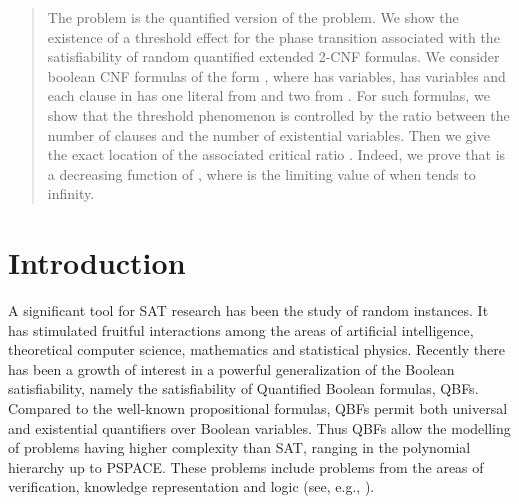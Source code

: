 \documentclass[aop,noinfoline]{imsart}
\begin{document}
\begin{frontmatter}
\begin{abstract}

The  problem is the quantified version of the  problem.
We show the existence of a threshold effect for the phase transition
associated with the satisfiability of random quantified extended 2-CNF
formulas. We consider boolean CNF formulas of the form , where  has  variables,  has 
variables and each clause in  has one literal from  and
two from . For such formulas, we show that the threshold
phenomenon is controlled by the ratio between the number of clauses
and the number  of existential variables. Then we give the exact
location of the associated critical ratio .  Indeed, we prove
that  is a decreasing function of , where  is
the limiting value of  when  tends to infinity. 



\end{abstract}


\begin{keyword}[class=AMS]
\end{keyword}

\begin{keyword}
\end{keyword}

\end{frontmatter}






\section{Introduction}\label{sec:introduction}




A significant tool for SAT research has been the study of random
instances.  It has stimulated fruitful interactions among the areas
of artificial intelligence, theoretical computer science,
mathematics and statistical physics. Recently there has been a
growth of interest in a powerful generalization of the Boolean
satisfiability, namely the satisfiability of Quantified Boolean
formulas, QBFs.  Compared to the well-known propositional
formulas, QBFs permit both universal and existential quantifiers
over Boolean variables. Thus QBFs allow  the modelling of problems
having higher complexity than SAT, ranging in the polynomial
hierarchy up to PSPACE. These problems include problems from the
areas of verification, knowledge representation and logic (see,
e.g., \cite{Egly00c}).
\end{document}
